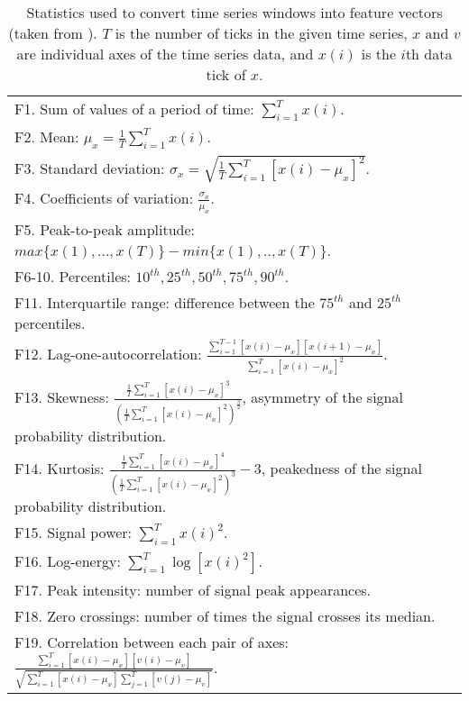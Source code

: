\vspace{1ex}
\begin{table}[H]
\centering
\begin{tabular}{|p{15cm}|}  \hline
F1. Sum of values of a period of time: $\sum^T_{i=1} x(i)$.\\ [2ex]
F2. Mean: $\mu_x = \frac{1}{T} \sum^T_{i=1} x(i)$.\\ [2ex]
F3. Standard deviation: $\sigma_x = \sqrt{\frac{1}{T} \sum^T_{i=1} [x(i) - \mu_x]^2}$.\\ [2ex]
F4. Coefficients of variation: $\frac{\sigma_x}{\mu_x}$. \\ [2ex]
F5. Peak-to-peak amplitude: $max \{x(1), ..., x(T)\} - min \{x(1), .., x(T)\}$.\\ [2ex]
F6-10. Percentiles: $10^{th}, 25^{th}, 50^{th}, 75^{th}, 90^{th}$.\\ [2ex]
F11. Interquartile range: difference between the $75^{th}$ and $25^{th}$ percentiles.\\ [2ex]
F12. Lag-one-autocorrelation: $\frac{\sum^{T-1}_{i=1} [x(i) - \mu_x][x(i+1) - \mu_x]}{\sum^T_{i=1} [x(i) - \mu_x]^2}$.\\ [2ex]
F13. Skewness:
 $\frac{\frac{1}{T} \sum^T_{i=1} [x(i) - \mu_x]^3}
{(\frac{1}{T} \sum^T_{i=1} [x(i) - \mu_x]^2)^\frac{3}{2}}$,
 asymmetry of the signal probability distribution.\\ [2ex]
F14. Kurtosis:
 $\frac{\frac{1}{T} \sum^T_{i=1} [x(i) - \mu_x]^4}
{(\frac{1}{T} \sum^T_{i=1} [x(i) - \mu_x]^2)^3} - 3$,
 peakedness of the signal probability distribution.\\ [2ex]
F15. Signal power: $\sum^T_{i=1} x(i)^2$.\\ [2ex]
F16. Log-energy: $\sum^T_{i=1} \log[x(i)^2]$.\\ [2ex]
F17. Peak intensity: number of signal peak appearances.\\ [2ex]
F18. Zero crossings: number of times the signal crosses its median.\\ [2ex]
F19. Correlation between each pair of axes:
 $\frac{\sum^T_{i=1}[x(i)-\mu_x][v(i)-\mu_v]}
{\sqrt{\sum^T_{i=1}[x(i)-\mu_x] \sum^T_{j=1}[v(j)-\mu_v]}}$.\\ [2ex] \hline
\end{tabular}
\caption{Statistics used to convert time series windows into feature vectors
(taken from \cite{zheng13}). $T$ is the number of ticks in the given time
series, $x$ and $v$ are individual axes of the time series data, and $x(i)$
is the $i$th data tick of $x$.}
\end{table}


